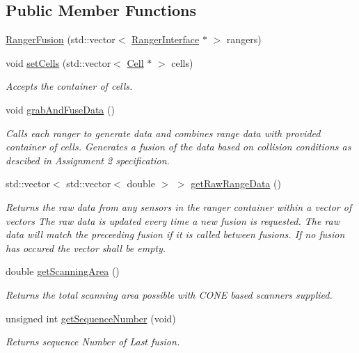 \subsection*{Public Member Functions}
\begin{DoxyCompactItemize}
\item 
\hyperlink{class_ranger_fusion_a977f1817c88c33e8f35695a530e44a9c}{Ranger\+Fusion} (std\+::vector$<$ \hyperlink{class_ranger_interface}{Ranger\+Interface} $\ast$ $>$ rangers)
\item 
void \hyperlink{class_ranger_fusion_ae3128f8cc8f4cb955d8db661aefba3dc}{set\+Cells} (std\+::vector$<$ \hyperlink{class_cell}{Cell} $\ast$ $>$ cells)
\begin{DoxyCompactList}\small\item\em Accepts the container of cells. \end{DoxyCompactList}\item 
void \hyperlink{class_ranger_fusion_aa9265f72bc3572567c9cf98cf6d9f0e1}{grab\+And\+Fuse\+Data} ()\hypertarget{class_ranger_fusion_aa9265f72bc3572567c9cf98cf6d9f0e1}{}\label{class_ranger_fusion_aa9265f72bc3572567c9cf98cf6d9f0e1}

\begin{DoxyCompactList}\small\item\em Calls each ranger to generate data and combines range data with provided container of cells. Generates a \textquotesingle{}fusion\textquotesingle{} of the data based on collision conditions as descibed in Assignment 2 specification. \end{DoxyCompactList}\item 
std\+::vector$<$ std\+::vector$<$ double $>$ $>$ \hyperlink{class_ranger_fusion_a5780383fdffe121a7a2372a047819ba9}{get\+Raw\+Range\+Data} ()
\begin{DoxyCompactList}\small\item\em Returns the raw data from any sensors in the ranger container within a vector of vectors The raw data is updated every time a new fusion is requested. The raw data will match the preceeding fusion if it is called between fusions. If no fusion has occured the vector shall be empty. \end{DoxyCompactList}\item 
double \hyperlink{class_ranger_fusion_a7215e5405e808b5a853984e2b70ed6ad}{get\+Scanning\+Area} ()
\begin{DoxyCompactList}\small\item\em Returns the total scanning area possible with C\+O\+NE based scanners supplied. \end{DoxyCompactList}\item 
unsigned int \hyperlink{class_ranger_fusion_ad5f1752d3f1ddf1d4250c7e434971f1c}{get\+Sequence\+Number} (void)
\begin{DoxyCompactList}\small\item\em Returns sequence Number of Last fusion. \end{DoxyCompactList}\end{DoxyCompactItemize}


